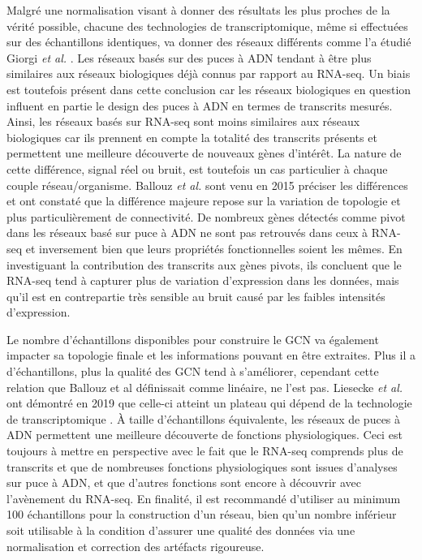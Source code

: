 Malgré une normalisation visant à donner des résultats les plus proches de la vérité possible, chacune des technologies de transcriptomique, même si effectuées sur des échantillons identiques, va donner des réseaux différents comme l'a étudié Giorgi \textit{et al.} \cite{Giorgi2013Mar}. Les réseaux basés sur des puces à ADN tendant à être plus similaires aux réseaux biologiques déjà connus par rapport au RNA-seq. Un biais est toutefois présent dans cette conclusion car les réseaux biologiques en question influent en partie le design des puces à ADN en termes de transcrits mesurés. Ainsi, les réseaux basés sur RNA-seq sont moins similaires aux réseaux biologiques car ils prennent en compte la totalité des transcrits présents et permettent une meilleure découverte de nouveaux gènes d'intérêt. La nature de cette différence, signal réel ou bruit, est toutefois un cas particulier à chaque couple réseau/organisme. Ballouz \textit{et al.} sont venu en 2015 \cite{Ballouz2015} préciser les différences et ont constaté que la différence majeure repose sur la variation de topologie et plus particulièrement de connectivité. De nombreux gènes détectés comme pivot dans les réseaux basé sur puce à ADN ne sont pas retrouvés dans ceux à RNA-seq et inversement bien que leurs propriétés fonctionnelles soient les mêmes. En investiguant la contribution des transcrits aux gènes pivots, ils concluent que le RNA-seq tend à capturer plus de variation d'expression dans les données, mais qu'il est en contrepartie très sensible au bruit causé par les faibles intensités d'expression. 

Le nombre d'échantillons disponibles pour construire le \acrshort{GCN} va également impacter sa topologie finale et les informations pouvant en être extraites. Plus il a d'échantillons, plus la qualité des \acrshort{GCN} tend à s'améliorer, cependant cette relation que Ballouz et al définissait comme linéaire, ne l'est pas. Liesecke \textit{et al.} ont démontré en 2019 que celle-ci atteint un plateau qui dépend de la technologie de transcriptomique \cite{Liesecke2019}. À taille d'échantillons équivalente, les réseaux de puces à ADN permettent une meilleure découverte de fonctions physiologiques. Ceci est toujours à mettre en perspective avec le fait que le RNA-seq comprends plus de transcrits et que de nombreuses fonctions physiologiques sont issues d'analyses sur puce à ADN, et que d'autres fonctions sont encore à découvrir avec l'avènement du RNA-seq. En finalité, il est recommandé d'utiliser au minimum 100 échantillons pour la construction d'un réseau, bien qu'un nombre inférieur soit utilisable à la condition d'assurer une qualité des données via une normalisation et correction des artéfacts rigoureuse. 

